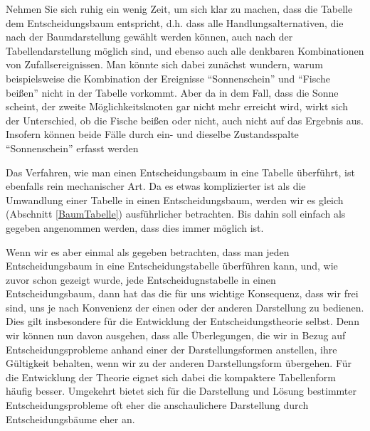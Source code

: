 Nehmen Sie sich ruhig ein wenig Zeit, um sich klar zu machen, dass die
Tabelle dem Entscheidungsbaum entspricht, d.h. dass alle
Handlungsalternativen, die nach der Baumdarstellung gewählt werden
können, auch nach der Tabellendarstellung möglich sind, und ebenso
auch alle denkbaren Kombinationen von Zufallsereignissen. Man könnte
sich dabei zunächst wundern, warum beispielsweise die Kombination der
Ereignisse "`Sonnenschein"' und "`Fische beißen"' nicht in der Tabelle
vorkommt. Aber da in dem Fall, dass die Sonne scheint, der zweite
Möglichkeitsknoten gar nicht mehr erreicht wird, wirkt sich der
Unterschied, ob die Fische beißen oder nicht, auch nicht auf das
Ergebnis aus. Insofern können beide Fälle durch ein- und dieselbe
Zustandsspalte "`Sonnenschein"' erfasst werden

Das Verfahren, wie man einen Entscheidungsbaum in eine Tabelle
überführt, ist ebenfalls rein mechanischer Art. Da es etwas
komplizierter ist als die Umwandlung einer Tabelle in einen
Entscheidungsbaum, werden wir es gleich (Abschnitt \ref{BaumTabelle})
ausführlicher betrachten. Bis dahin soll einfach als gegeben
angenommen werden, dass dies immer möglich ist.


Wenn wir es aber einmal als gegeben betrachten, dass man jeden
Entscheidungsbaum in eine Entscheidungstabelle überführen kann, und,
wie zuvor schon gezeigt wurde, jede Entscheidugnstabelle in einen
Entscheidungsbaum, dann hat das die für uns wichtige Konsequenz, dass
wir frei sind, uns je nach Konvenienz der einen oder der anderen
Darstellung zu bedienen. Dies gilt insbesondere für die Entwicklung
der Entscheidungstheorie selbst. Denn wir können nun davon ausgehen,
dass alle Überlegungen, die wir in Bezug auf Entscheidungsprobleme
anhand einer der Darstellungsformen anstellen, ihre Gültigkeit
behalten, wenn wir zu der anderen Darstellungsform übergehen. Für die
Entwicklung der Theorie eignet sich dabei die kompaktere Tabellenform
häufig besser. Umgekehrt bietet sich für die Darstellung und Lösung
bestimmter Entscheidungsprobleme oft eher die anschaulichere
Darstellung durch Entscheidungsbäume eher an.

